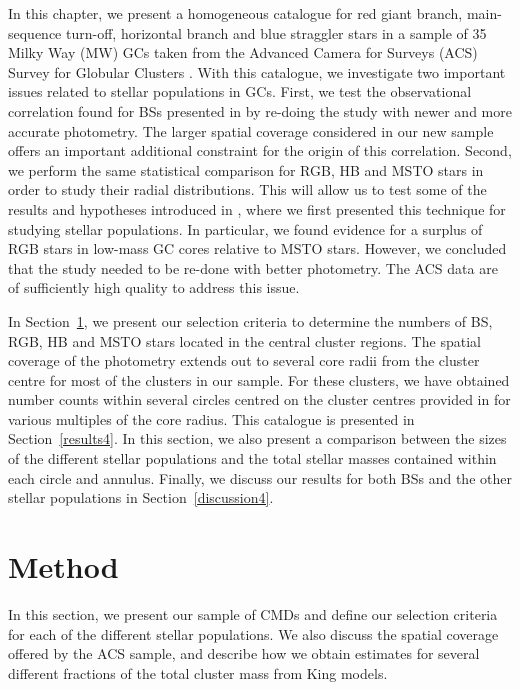 In this chapter, we present a homogeneous catalogue for red giant
branch, main-sequence turn-off, horizontal branch and blue
straggler stars in a sample of 35 Milky Way (MW) GCs
taken from the Advanced Camera for Surveys
(ACS) Survey for Globular Clusters \citep{sarajedini07}.  With this
catalogue, we investigate two important issues related to stellar
populations in GCs.  First, we test the observational correlation
found for BSs presented in \citet{knigge09} by re-doing the study with
newer and more accurate photometry.  The larger spatial coverage
considered in our new sample 
offers an important additional constraint for the origin of this correlation.  
Second, we perform the same statistical comparison for RGB, HB and
MSTO stars in 
order to study their radial distributions.  This will allow us to test
some of the results and hypotheses introduced in \citet{leigh09},
where we first presented this
technique for studying stellar populations.  In
particular, we found evidence for a surplus of RGB stars in
low-mass GC cores relative to MSTO stars.  However,
we concluded that the study needed to be re-done with better
photometry.  The ACS data are of sufficiently high quality to address
this issue.

In Section~\ref{method4}, we present our selection criteria to
determine the numbers of BS, RGB, HB and MSTO stars located in the central
cluster regions.  The spatial coverage of the photometry extends out
to several core radii from the cluster centre for most of the clusters
in our sample.  For these clusters, we have obtained number counts within
several circles centred on the cluster centres provided in
\citet{goldsbury10} 
for various multiples of the core radius.  This catalogue is presented in
Section~\ref{results4}.  In this section, we also present a comparison
between the sizes of the different stellar populations and the total
stellar masses contained within each circle and annulus.  Finally,
we discuss our results for both BSs and the other 
stellar populations in Section~\ref{discussion4}.   

\section{Method} \label{method4}

In this section, we present our sample of CMDs and define our
selection criteria for each of the different stellar populations.  We
also discuss the spatial coverage offered by the ACS sample, and
describe how we obtain estimates for several different fractions of
the total cluster mass from King models.

